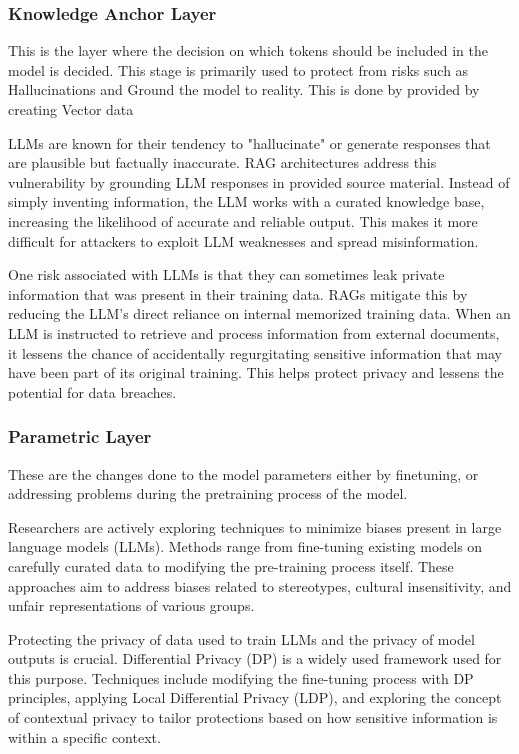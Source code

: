 \documentclass[11pt]{article}
\begin{document}
\subsubsection{ Knowledge Anchor Layer }

This is the layer where the decision on which tokens should be included in the model is decided. This stage is primarily used to protect from risks such as Hallucinations and Ground the model to reality. This is done by provided by creating Vector data

LLMs are known for their tendency to "hallucinate" or generate responses that are plausible but factually inaccurate.  RAG architectures address this vulnerability by grounding LLM responses in provided source material. Instead of simply inventing information, the LLM works with a curated knowledge base, increasing the likelihood of accurate and reliable output. This makes it more difficult for attackers to exploit LLM weaknesses and spread misinformation.

One risk associated with LLMs is that they can sometimes leak private information that was present in their training data. RAGs mitigate this by reducing the LLM's direct reliance on internal memorized training data. When an LLM is instructed to retrieve and process information from external documents, it lessens the chance of accidentally regurgitating sensitive information that may have been part of its original training. This helps protect privacy and lessens the potential for data breaches.

\subsubsection{ Parametric Layer }

These are the changes done to the model parameters either by finetuning, or addressing problems during the pretraining process of the model.

Researchers are actively exploring techniques to minimize biases present in large language models (LLMs). Methods range from fine-tuning existing models on carefully curated data to modifying the pre-training process itself.  These approaches aim to address biases related to stereotypes, cultural insensitivity, and unfair representations of various groups.

Protecting the privacy of data used to train LLMs and the privacy of model outputs is crucial. Differential Privacy (DP) is a widely used framework used for this purpose. Techniques include modifying the fine-tuning process with DP principles, applying Local Differential Privacy (LDP), and exploring the concept of contextual privacy to tailor protections based on how sensitive information is within a specific context.
\end{document}
